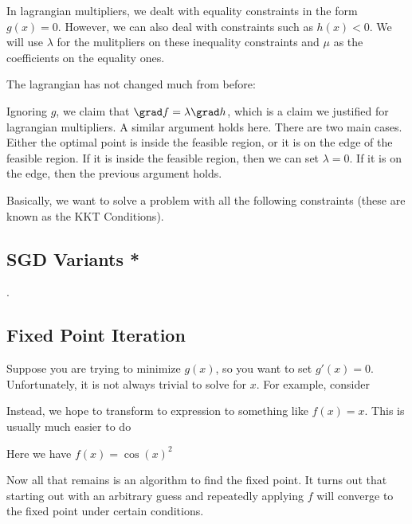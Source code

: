 \documentclass[12pt]{article}
\begin{document}
In lagrangian multipliers, we dealt with equality constraints in the form $g(x) = 0$. However, we can also deal with constraints such as $h(x) < 0$. We will use $\lambda$ for the mulitpliers on these inequality constraints and $\mu$ as the coefficients on the equality ones.

The lagrangian has not changed much from before:


Ignoring $g$, we claim that $\grad f = \lambda \grad h$, which is a claim we justified for lagrangian multipliers. A similar argument holds here. There are two main cases. Either the optimal point is inside the feasible region, or it is on the edge of the feasible region. If it is inside the feasible region, then we can set $\lambda = 0$. If it is on the edge, then the previous argument holds.

Basically, we want to solve a problem with all the following constraints (these are known as the KKT Conditions). 


\subsection{SGD Variants *}
.
\subsection{Fixed Point Iteration}

Suppose you are trying to minimize $g(x)$, so you want to set $g'(x) = 0$. Unfortunately, it is not always trivial to solve for $x$. For example, consider


Instead, we hope to transform to expression to something like $f(x) = x$. This is usually much easier to do


Here we have $f(x) = \cos(x)^2$

Now all that remains is an algorithm to find the fixed point. It turns out that starting out with an arbitrary guess and repeatedly applying $f$ will converge to the fixed point under certain conditions.
\end{document}

